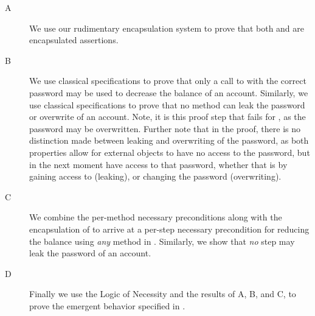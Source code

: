 \begin{description}
\item[A]
We use our rudimentary encapsulation system to prove that both  and  are encapsulated assertions.
\item[B]
We use classical specifications to prove that only a call to  
with the correct password may be used to decrease the balance of an account. Similarly, we
use classical specifications to prove that no method can leak the password or overwrite of an account.
Note, it is this proof step that fails for , as the password may be overwritten. Further note that in the 
proof, there is no distinction made between leaking and overwriting of the password, as both properties allow for external 
objects to have no access to the password, but in the next moment have access to that password, whether that is 
by gaining access to (leaking), or changing the password (overwriting).
\item[C]
We combine the per-method necessary preconditions along with the encapsulation of  to arrive at a per-step
necessary precondition for reducing the balance using \emph{any} method in . Similarly, 
we show that \emph{no} step may leak the password of an account.
\item[D]
Finally we use the Logic of Necessity and the results of A, B, and C, to prove the emergent behavior specified in .
\end{description}


